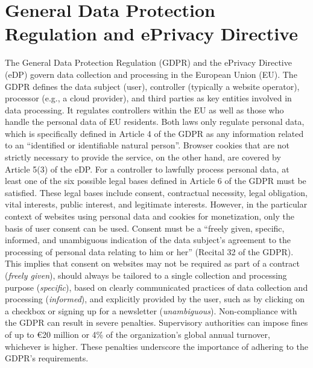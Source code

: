 \section{General Data Protection Regulation and ePrivacy Directive} \label{sec:legal}
The General Data Protection Regulation (GDPR) and the ePrivacy Directive (eDP) govern data collection and processing in the European Union (EU).
The GDPR defines the data subject (user), controller (typically a website operator), processor (e.g., a cloud provider), and third parties as key entities involved in data processing.
It regulates controllers within the EU as well as those who handle the personal data of EU residents.
Both laws only regulate personal data, which is specifically defined in Article 4 of the GDPR as any information related to an \enquote{identified or identifiable natural person}.
Browser cookies that are not strictly necessary to provide the service, on the other hand, are covered by Article 5(3) of the eDP.
For a controller to lawfully process personal data, at least one of the six possible legal bases defined in Article 6 of the GDPR must be satisfied.
These legal bases include consent, contractual necessity, legal obligation, vital interests, public interest, and legitimate interests.
However, in the particular context of websites using personal data and cookies for monetization, only the basis of user consent can be used.
Consent must be a \enquote{freely given, specific, informed, and unambiguous indication of the data subject's agreement to the processing of personal data relating to him or her} (Recital 32 of the GDPR).
This implies that consent on websites may not be required as part of a contract (\emph{freely given}), should always be tailored to a single collection and processing purpose (\emph{specific}), based on clearly communicated practices of data collection and processing (\emph{informed}), and explicitly provided by the user, such as by clicking on a checkbox or signing up for a newsletter (\emph{unambiguous}).
Non-compliance with the GDPR can result in severe penalties. 
Supervisory authorities can impose fines of up to €20 million or 4\% of the organization's global annual turnover, whichever is higher. 
These penalties underscore the importance of adhering to the GDPR's requirements.
